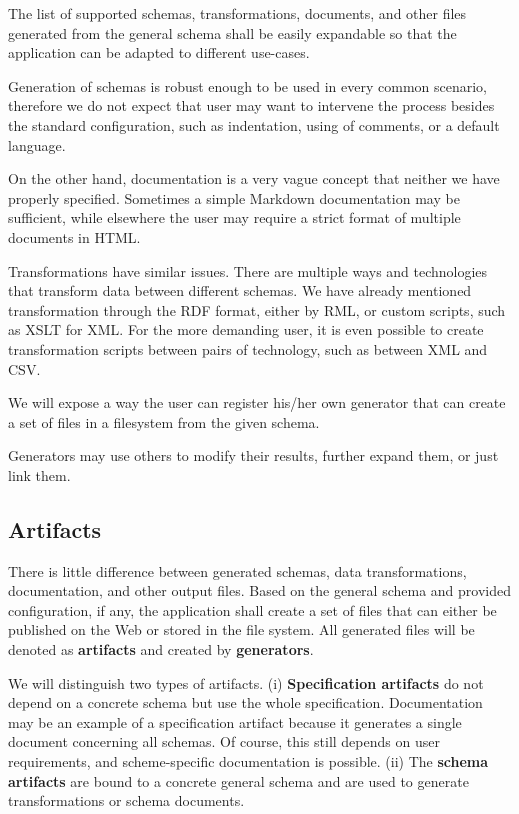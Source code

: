 \begin{requirement}
  The list of supported schemas, transformations, documents, and other files generated from the general schema shall be easily expandable so that the application can be adapted to different use-cases.
\end{requirement}

Generation of schemas is robust enough to be used in every common scenario, therefore we do not expect that user may want to intervene the process besides the standard configuration, such as indentation, using of comments, or a default language.

On the other hand, documentation is a very vague concept that neither we have properly specified. Sometimes a simple Markdown documentation may be sufficient, while elsewhere the user may require a strict format of multiple documents in HTML.

Transformations have similar issues. There are multiple ways and technologies that transform data between different schemas. We have already mentioned transformation through the RDF format, either by RML, or custom scripts, such as XSLT for XML. For the more demanding user, it is even possible to create transformation scripts between pairs of technology, such as between XML and CSV.

We will expose a way the user can register his/her own generator that can create a set of files in a filesystem from the given schema.

Generators may use others to modify their results, further expand them, or just link them.

\subsection{Artifacts}

There is little difference between generated schemas, data transformations, documentation, and other output files. Based on the general schema and provided configuration, if any, the application shall create a set of files that can either be published on the Web or stored in the file system. All generated files will be denoted as \textbf{artifacts} and created by \textbf{generators}.

We will distinguish two types of artifacts. (i) \textbf{Specification artifacts} do not depend on a concrete schema but use the whole specification. Documentation may be an example of a specification artifact because it generates a single document concerning all schemas. Of course, this still depends on user requirements, and scheme-specific documentation is possible. (ii) The \textbf{schema artifacts} are bound to a concrete general schema and are used to generate transformations or schema documents.

